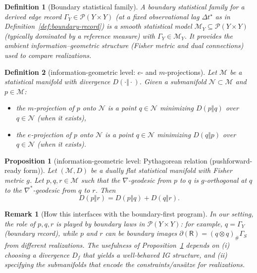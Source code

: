\documentclass[11pt]{article}
\newtheorem{definition}{Definition}
\newtheorem{proposition}{Proposition}
\newtheorem{remark}{Remark}
\newcommand{\Pcal}{\mathcal{P}}
\newcommand{\Mcal}{\mathcal{M}}
\begin{document}
\begin{definition}[Boundary statistical family]
\label{def:statistical-family-boundary}
A \emph{boundary statistical family} for a derived edge record $\Gamma_Y\in\Pcal(Y\times Y)$ (at a fixed observational lag $\Delta t^\star$ as in Definition~\ref{def:boundary-record}) is a smooth statistical model
$\Mcal_Y\subseteq\Pcal(Y\times Y)$ (typically dominated by a reference measure) with $\Gamma_Y\in\Mcal_Y$.
It provides the ambient information--geometric structure (Fisher metric and dual connections) used to compare realizations.
\end{definition}

\begin{definition}[information-geometric level: $e$- and $m$-projections]
\label{def:em-projections}
Let $\mathcal M$ be a statistical manifold with divergence $D(\cdot\Vert\cdot)$.
Given a submanifold $\mathcal N\subset\mathcal M$ and $p\in\mathcal M$:
\begin{itemize}[leftmargin=1.6em]
\item the \emph{$m$-projection} of $p$ onto $\mathcal N$ is a point $q\in\mathcal N$ minimizing $D(p\Vert q)$ over $q\in\mathcal N$ (when it exists),
\item the \emph{$e$-projection} of $p$ onto $\mathcal N$ is a point $q\in\mathcal N$ minimizing $D(q\Vert p)$ over $q\in\mathcal N$ (when it exists).
\end{itemize}
\end{definition}

\begin{proposition}[information-geometric level: Pythagorean relation (pushforward-ready form)]
\label{prop:pythagorean}
Let $(\mathcal M,D)$ be a dually flat statistical manifold with Fisher metric $g$.
Let $p,q,r\in\mathcal M$ such that the $\nabla$-geodesic from $p$ to $q$ is $g$-orthogonal at $q$ to the $\nabla^\ast$-geodesic from $q$ to $r$.
Then
\[
D(p\Vert r) = D(p\Vert q) + D(q\Vert r).
\]
\end{proposition}

\begin{remark}[How this interfaces with the boundary-first program]
In our setting, the role of $p,q,r$ is played by \emph{boundary laws} in $\Pcal(Y\times Y)$:
for example, $q=\Gamma_Y$ (boundary record), while $p$ and $r$ can be boundary images $\partial(\mathsf R)=(q\otimes q)_\#\Gamma_S$ from different realizations.
The usefulness of Proposition~\ref{prop:pythagorean} depends on (i) choosing a divergence $D_f$ that yields a well-behaved IG structure, and (ii) specifying the submanifolds that encode the constraints/ans\"atze for realizations.
\end{remark}
\end{document}
